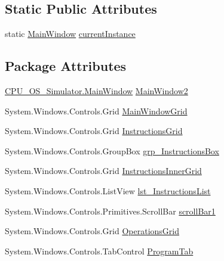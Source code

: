 \subsection*{Static Public Attributes}
\begin{DoxyCompactItemize}
\item 
static \hyperlink{class_c_p_u___o_s___simulator_1_1_main_window}{Main\+Window} \hyperlink{class_c_p_u___o_s___simulator_1_1_main_window_a1280266cc57403a91f08a8350dee05cc}{current\+Instance}
\end{DoxyCompactItemize}
\subsection*{Package Attributes}
\begin{DoxyCompactItemize}
\item 
\hyperlink{class_c_p_u___o_s___simulator_1_1_main_window}{C\+P\+U\+\_\+\+O\+S\+\_\+\+Simulator.\+Main\+Window} \hyperlink{class_c_p_u___o_s___simulator_1_1_main_window_adf996cda04d3cf426847b8fd8981ee66}{Main\+Window2}
\item 
System.\+Windows.\+Controls.\+Grid \hyperlink{class_c_p_u___o_s___simulator_1_1_main_window_a5c56d82a7b611446e81b7baa3229d76b}{Main\+Window\+Grid}
\item 
System.\+Windows.\+Controls.\+Grid \hyperlink{class_c_p_u___o_s___simulator_1_1_main_window_a2e6841673af413e8a8f8ba8aa0d7c80b}{Instructions\+Grid}
\item 
System.\+Windows.\+Controls.\+Group\+Box \hyperlink{class_c_p_u___o_s___simulator_1_1_main_window_aebc1256b654d001b7c4ce2bc08522667}{grp\+\_\+\+Instructions\+Box}
\item 
System.\+Windows.\+Controls.\+Grid \hyperlink{class_c_p_u___o_s___simulator_1_1_main_window_a94a99eeb7f5fcfcfbdc375937d5439e7}{Instructions\+Inner\+Grid}
\item 
System.\+Windows.\+Controls.\+List\+View \hyperlink{class_c_p_u___o_s___simulator_1_1_main_window_acdab094f589df9435fa8e3bfe04e61cb}{lst\+\_\+\+Instructions\+List}
\item 
System.\+Windows.\+Controls.\+Primitives.\+Scroll\+Bar \hyperlink{class_c_p_u___o_s___simulator_1_1_main_window_a014812a0e9cd159be05250d94d9a5a8b}{scroll\+Bar1}
\item 
System.\+Windows.\+Controls.\+Grid \hyperlink{class_c_p_u___o_s___simulator_1_1_main_window_ae4f2459995eb2f672c0fd3c2248b79fd}{Operations\+Grid}
\item 
System.\+Windows.\+Controls.\+Tab\+Control \hyperlink{class_c_p_u___o_s___simulator_1_1_main_window_a615ea960969aa9a61afdaef8cf039348}{Program\+Tab}

\end{DoxyCompactItemize}
